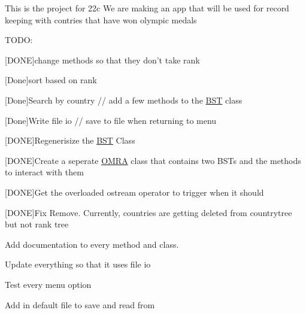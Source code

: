This is the project for 22c We are making an app that will be used for record keeping with contries that have won olympic medals

T\+O\+D\+O\+:
\begin{DoxyItemize}
\item \mbox{[}D\+O\+N\+E\mbox{]}change methods so that they don’t take rank
\item \mbox{[}Done\mbox{]}sort based on rank
\item \mbox{[}Done\mbox{]}Search by country // add a few methods to the \hyperlink{class_b_s_t}{B\+S\+T} class
\item \mbox{[}Done\mbox{]}Write file io // save to file when returning to menu
\item \mbox{[}D\+O\+N\+E\mbox{]}Regenerisize the \hyperlink{class_b_s_t}{B\+S\+T} Class
\item \mbox{[}D\+O\+N\+E\mbox{]}Create a seperate \hyperlink{class_o_m_r_a}{O\+M\+R\+A} class that contains two B\+S\+Ts and the methods to interact with them
\item \mbox{[}D\+O\+N\+E\mbox{]}Get the overloaded ostream operator to trigger when it should
\item \mbox{[}D\+O\+N\+E\mbox{]}Fix Remove. Currently, countries are getting deleted from countrytree but not rank tree
\item Add documentation to every method and class.
\item Update everything so that it uses file io
\item Test every menu option
\item Add in default file to save and read from 
\end{DoxyItemize}